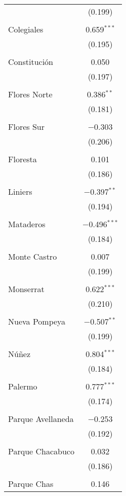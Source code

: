 \begin{table}[!htbp]
\begin{tabular}{@{\extracolsep{5pt}}lc}
  & (0.199) \\ 
  & \\ 
 Colegiales & 0.659$^{***}$ \\ 
  & (0.195) \\ 
  & \\ 
 Constitución & 0.050 \\ 
  & (0.197) \\ 
  & \\ 
 Flores Norte & 0.386$^{**}$ \\ 
  & (0.181) \\ 
  & \\ 
 Flores Sur & $-$0.303 \\ 
  & (0.206) \\ 
  & \\ 
 Floresta & 0.101 \\ 
  & (0.186) \\ 
  & \\ 
 Liniers & $-$0.397$^{**}$ \\ 
  & (0.194) \\ 
  & \\ 
 Mataderos & $-$0.496$^{***}$ \\ 
  & (0.184) \\ 
  & \\ 
 Monte Castro & 0.007 \\ 
  & (0.199) \\ 
  & \\ 
 Monserrat & 0.622$^{***}$ \\ 
  & (0.210) \\ 
  & \\ 
 Nueva Pompeya & $-$0.507$^{**}$ \\ 
  & (0.199) \\ 
  & \\ 
 Núñez & 0.804$^{***}$ \\ 
  & (0.184) \\ 
  & \\ 
 Palermo & 0.777$^{***}$ \\ 
  & (0.174) \\ 
  & \\ 
 Parque Avellaneda & $-$0.253 \\ 
  & (0.192) \\ 
  & \\ 
 Parque Chacabuco & 0.032 \\ 
  & (0.186) \\ 
  & \\ 
 Parque Chas & 0.146 \\ 

\end{tabular}
\end{table}
